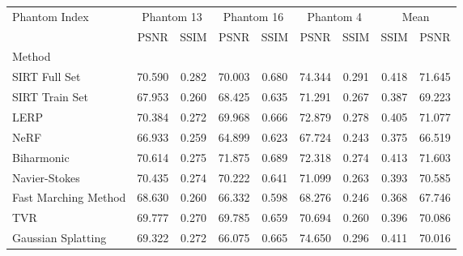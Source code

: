 \begin{tabular}{|l|cc|cc|cc|cc|}
\toprule
Phantom Index & \multicolumn{2}{c|}{Phantom 13} & \multicolumn{2}{c|}{Phantom 16} & \multicolumn{2}{c|}{Phantom 4} & \multicolumn{2}{c|}{Mean} \\
 & PSNR & SSIM & PSNR & SSIM & PSNR & SSIM & SSIM & PSNR \\
Method &  &  &  &  &  &  &  &  \\
\midrule
SIRT Full Set & 70.590 & 0.282 & 70.003 & 0.680 & 74.344 & 0.291 & 0.418 & 71.645 \\
SIRT Train Set & 67.953 & 0.260 & 68.425 & 0.635 & 71.291 & 0.267 & 0.387 & 69.223 \\
LERP & 70.384 & 0.272 & 69.968 & 0.666 & 72.879 & 0.278 & 0.405 & 71.077 \\
NeRF & 66.933 & 0.259 & 64.899 & 0.623 & 67.724 & 0.243 & 0.375 & 66.519 \\
Biharmonic & 70.614 & 0.275 & 71.875 & 0.689 & 72.318 & 0.274 & 0.413 & 71.603 \\
Navier-Stokes & 70.435 & 0.274 & 70.222 & 0.641 & 71.099 & 0.263 & 0.393 & 70.585 \\
Fast Marching Method & 68.630 & 0.260 & 66.332 & 0.598 & 68.276 & 0.246 & 0.368 & 67.746 \\
TVR & 69.777 & 0.270 & 69.785 & 0.659 & 70.694 & 0.260 & 0.396 & 70.086 \\
Gaussian Splatting & 69.322 & 0.272 & 66.075 & 0.665 & 74.650 & 0.296 & 0.411 & 70.016 \\
\bottomrule
\end{tabular}
